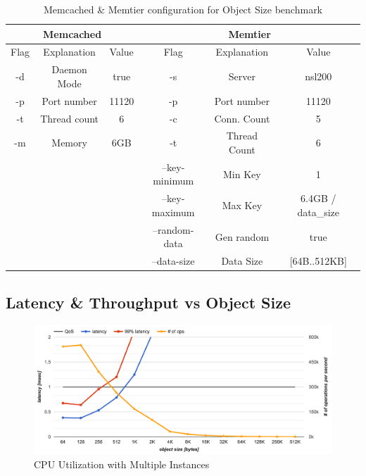 \begin{table}[h!]
\centering
\begin{tabular}{| c c c | c c c |}
 \hline
 \multicolumn{3}{|c|}{Memcached} & \multicolumn{3}{|c|}{Memtier} \\
 \hline
 Flag & Explanation & Value & Flag & Explanation & Value \\ [0.5ex]
 \hline\hline

 -d & Daemon Mode & true        & -s & Server & nsl200 \\
 -p & Port number & 11120       & -p & Port number & 11120 \\
 -t & Thread count & 6          & -c & Conn. Count & 5 \\
 -m & Memory & 6GB              & -t & Thread Count & 6 \\
 & &                            & --key-minimum & Min Key & 1 \\
 & &                            & --key-maximum & Max Key & 6.4GB / data\_size \\
 & &                            & --random-data & Gen random & true \\
 & &                            & --data-size & Data Size & [64B..512KB] \\

 \hline

\end{tabular}
\caption{Memcached \& Memtier configuration for Object Size benchmark}
\label{tab:m_object_size_config}
\end{table}

\subsection{Latency \& Throughput vs Object Size}

\begin{figure}[h]
    \includegraphics[width=\textwidth]{./res2/m_object_size_latency.png}
    \caption{CPU Utilization with Multiple Instances}
    \label{fig:m_object_size_latency}
\end{figure}

